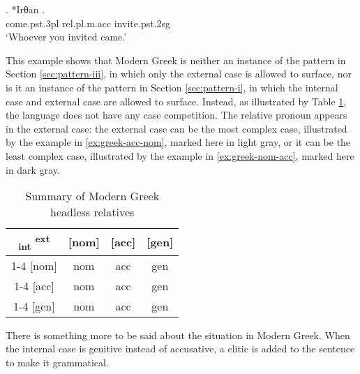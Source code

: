 \exg. *Irθan  .\\
come.\ac{pst}.3\ac{pl}\scsub{[nom]} \ac{rel}.\ac{pl}.\ac{m}.\ac{acc} invite.\ac{pst}.2\ac{sg}\scsub{[acc]}\\
`Whoever you invited came.'\label{ex:greek-nom-acc-u}

This example shows that Modern Greek is neither an instance of the pattern in Section \ref{sec:pattern-iii}, in which only the external case is allowed to surface, nor is it an instance of the pattern in Section \ref{sec:pattern-i}, in which the internal case and external case are allowed to surface.
Instead, as illustrated by Table \ref{tbl:no-case-competition-greek}, the language does not have any case competition. The relative pronoun appears in the external case: the external case can be the most complex case, illustrated by the example in \ref{ex:greek-acc-nom}, marked here in light gray, or it can be the least complex case, illustrated by the example in \ref{ex:greek-nom-acc}, marked here in dark gray.

\begin{table}[ht]
  \center
  \caption{Summary of Modern Greek headless relatives}
  \begin{tabular}{c|c|c|c}
    \toprule
   \textsubscript{\ac{int}} \textsuperscript{\ac{ext}}
          & [\ac{nom}]
          & [\ac{acc}]
          & [\ac{gen}]
          \\ \cmidrule{1-4}
      [\ac{nom}]
          & \ac{nom}
          & \cellcolor{LG}\ac{acc}
          & \ac{gen}
          \\ \cmidrule{1-4}
      [\ac{acc}]
          & \cellcolor{DG}\ac{nom}
          & \ac{acc}
          & \ac{gen}
          \\ \cmidrule{1-4}
      [\ac{gen}]
          & \ac{nom}
          & \ac{acc}
          & \ac{gen}
          \\
    \bottomrule
  \end{tabular}
  \label{tbl:no-case-competition-greek}
\end{table}

There is something more to be said about the situation in Modern Greek. When the internal case is genitive instead of accusative, a clitic is added to the sentence to make it grammatical.

